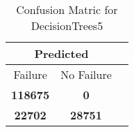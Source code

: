 \begin{table}[] 
\caption{Confusion Matric for DecisionTrees5} 
\label{Table: Prediction Accuracy-DMDDecisionTrees5OnlySunEKF-combinationReflectionperfectNoFailurePrediction-Reflection} 
\centering 
\begin{tabular} 
 {@{}ccc@{}} 
\toprule 
\multicolumn{2}{c}{\textbf{Predicted}}
 \\ \midrule 
\multicolumn{1}{|c|}{Failure} & 
\multicolumn{1}{c|}{No Failure}
 \\ \midrule 
\multicolumn{1}{|c|}{\color{green}\textbf{118675}} & 
\multicolumn{1}{c|}{\color{red}\textbf{0}}
 \\ \midrule 
\multicolumn{1}{|c|}{\color{red}\textbf{22702}} & 
\multicolumn{1}{c|}{\color{green}\textbf{28751}}
 \\ \bottomrule 
\end{tabular} 
\end{table} 
